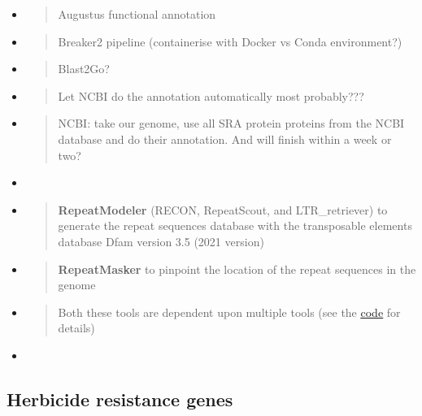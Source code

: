 \begin{itemize}
\item
  \begin{quote}
  Augustus functional annotation
  \end{quote}
\item
  \begin{quote}
  Breaker2 pipeline (containerise with Docker vs Conda environment?)
  \end{quote}
\item
  \begin{quote}
  Blast2Go?
  \end{quote}
\item
  \begin{quote}
  Let NCBI do the annotation automatically most probably???
  \end{quote}
\item
  \begin{quote}
  NCBI: take our genome, use all SRA protein proteins from the NCBI
  database and do their annotation. And will finish within a week or
  two?
  \end{quote}
\item
\item
  \begin{quote}
  \textbf{RepeatModeler} (RECON, RepeatScout, and LTR\_retriever) to
  generate the repeat sequences database with the transposable elements
  database Dfam version 3.5 (2021 version)
  \end{quote}
\item
  \begin{quote}
  \textbf{RepeatMasker} to pinpoint the location of the repeat sequences
  in the genome
  \end{quote}
\item
  \begin{quote}
  Both these tools are dependent upon multiple tools (see the
  \href{https://github.com/jeffersonfparil/Lolium_rigidum_genome_assembly_and_annotation/blob/main/repetitive_elements_identification.md}{\uline{code}}
  for details)
  \end{quote}
\item
\end{itemize}

\hypertarget{herbicide-resistance-genes}{%
\subsection{Herbicide resistance
genes}\label{herbicide-resistance-genes}}

